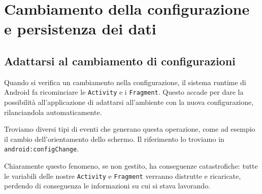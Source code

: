 %

% 


\newcommand{\Activity}{\texttt{Activity}\xspace}
\newcommand{\Intent}{\texttt{Intent}\xspace}
\newcommand{\View}{\texttt{View}\xspace}
\newcommand{\ViewGroup}{\texttt{ViewGroup}\xspace}
\newcommand{\LinearLayout}{\texttt{LinearLayout}\xspace}
\newcommand{\RelativeLayout}{\texttt{RelativeLayout}\xspace}
\newcommand{\ScrollView}{\texttt{ScrollView}\xspace}
\newcommand{\ListView}{\texttt{ListView}\xspace}
\newcommand{\SharedPreferences}{\texttt{SharedPreferences}\xspace}
\newcommand{\ListFragment}{\texttt{ListFragment}\xspace}
\newcommand{\MainActivity}{\texttt{MainActivity}\xspace}
\newcommand{\AsyncTask}{\texttt{AsyncTask}\xspace}
\newcommand{\FrameLayout}{\texttt{FrameLayout}\xspace}
\newcommand{\WorkoutListFragment}{\texttt{WorkoutListFragment}\xspace}
\newcommand{\Fragment}{\texttt{Fragment}\xspace}
\newcommand{\SQLiteDatabase}{\texttt{SQLiteDatabase}\xspace}
\newcommand{\SQLiteOpenHelper}{\texttt{SQLiteOpenHelper}\xspace}
\newcommand{\Cursor}{\texttt{Cursor}\xspace}

\chapter{Cambiamento della configurazione e persistenza dei dati}

\section{Adattarsi al cambiamento di configurazioni}
Quando si verifica un cambiamento nella configurazione, il sistema runtime di
Android fa ricominciare le \Activity e i \Fragment. Questo accade per dare la
possibilità all'applicazione di adattarsi all'ambiente con la nuova
configurazione, rilanciandola automaticamente. 

Troviamo diversi tipi di eventi che generano questa operazione, come ad esempio il cambio dell'orientamento dello schermo.
Il riferimento lo troviamo in \texttt{android:configChange}.

Chiaramente questo fenomeno, se non gestito, ha conseguenze catastrofiche: tutte
le variabili delle nostre \Activity e \Fragment verranno distrutte e ricaricate,
perdendo di conseguenza le informazioni su cui si stava lavorando. 

